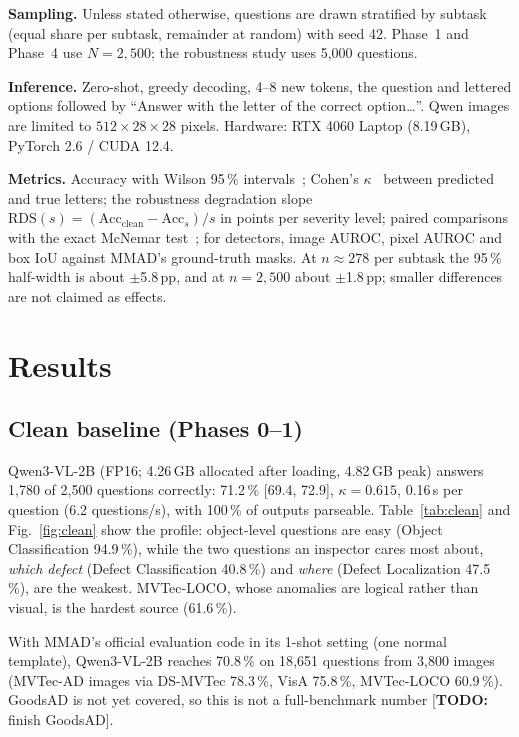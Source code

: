 \documentclass[conference]{IEEEtran}
\newcommand{\todo}[1]{\textcolor{red!70!black}{[\textbf{TODO:} #1]}}
\newcommand{\pp}{\,pp}          %
\begin{document}
\textbf{Sampling.} Unless stated otherwise, questions are drawn stratified by
subtask (equal share per subtask, remainder at random) with seed 42. Phase~1 and
Phase~4 use $N{=}2{,}500$; the robustness study uses 5{,}000 questions.

\textbf{Inference.} Zero-shot, greedy decoding, 4--8 new tokens, the question and
lettered options followed by ``Answer with the letter of the correct option\ldots''.
Qwen images are limited to $512{\times}28{\times}28$ pixels. Hardware: RTX 4060 Laptop
(8.19\,GB), PyTorch 2.6 / CUDA 12.4.

\textbf{Metrics.} Accuracy with Wilson 95\,\% intervals~\cite{wilson1927}; Cohen's
$\kappa$~\cite{cohen1960kappa} between predicted and true letters; the robustness
degradation slope $\mathrm{RDS}(s) = (\mathrm{Acc}_{\text{clean}} -
\mathrm{Acc}_{s})/s$ in points per severity level; paired comparisons with the exact
McNemar test~\cite{mcnemar1947}; for detectors, image AUROC, pixel AUROC and box IoU
against MMAD's ground-truth masks. At $n{\approx}278$ per subtask the 95\,\%
half-width is about $\pm$5.8\pp, and at $n{=}2{,}500$ about $\pm$1.8\pp; smaller
differences are not claimed as effects.

\section{Results}

\subsection{Clean baseline (Phases 0--1)}\label{sec:clean}

Qwen3-VL-2B (FP16; 4.26\,GB allocated after loading, 4.82\,GB peak) answers 1{,}780 of 2{,}500 questions correctly:
71.2\,\% [69.4, 72.9], $\kappa{=}0.615$, 0.16\,s per question (6.2 questions/s), with
100\,\% of outputs parseable. Table~\ref{tab:clean} and Fig.~\ref{fig:clean} show
the profile: object-level questions are easy (Object Classification 94.9\,\%), while
the two questions an inspector cares most about, \emph{which defect}
(Defect Classification 40.8\,\%) and \emph{where} (Defect Localization 47.5\,\%),
are the weakest. MVTec-LOCO, whose anomalies are logical rather than visual, is the
hardest source (61.6\,\%).

With MMAD's official evaluation code in its 1-shot setting (one normal template),
Qwen3-VL-2B reaches 70.8\,\% on 18{,}651 questions from 3{,}800 images
(MVTec-AD images via DS-MVTec 78.3\,\%, VisA 75.8\,\%, MVTec-LOCO 60.9\,\%). GoodsAD is
not yet covered, so this is not a full-benchmark number \todo{finish GoodsAD}.
\end{document}
